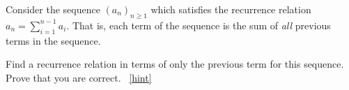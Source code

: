 \documentclass{book}
\begin{document}
\setcounter{project}{142}
\addtocounter{project}{-1}
\begin{activity}[]\label{activity-135}
\hypertarget{p-969}{}%
Consider the sequence \((a_n)_{n \ge 1}\) which satisfies the recurrence relation \(a_n = \sum_{i = 1}^{n-1} a_i\).  That is, each term of the sequence is the sum of \emph{all} previous terms in the sequence.%
\par
\hypertarget{p-970}{}%
Find a recurrence relation in terms of only the previous term for this sequence.  Prove that you are correct.%
~\hfill{\tiny\hyperlink{a-142}{[hint]}\hypertarget{q-142}{}}\end{activity}
\end{document}
